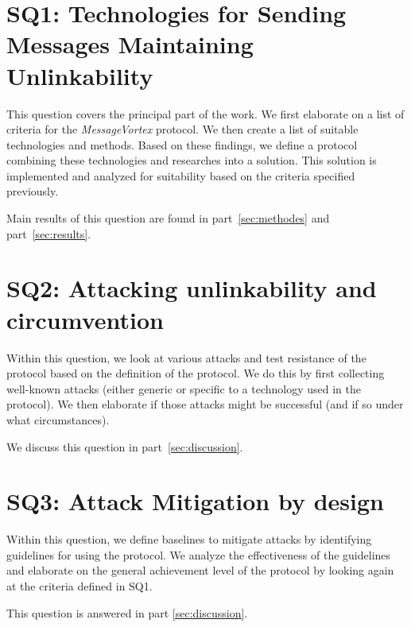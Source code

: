 \section{SQ1: Technologies for Sending Messages Maintaining Unlinkability}
This question covers the principal part of the work. We first elaborate on a list of criteria for the \emph{MessageVortex} protocol. We then create a list of suitable technologies and methods. Based on these findings, we define a protocol combining these technologies and researches into a solution. This solution is implemented and analyzed for suitability based on the criteria specified previously.

Main results of this question are found in part~\ref{sec:methodes} and part~\ref{sec:results}.

\section{SQ2: Attacking unlinkability and circumvention}
Within this question, we look at various attacks and test resistance of the protocol based on the definition of the protocol. We do this by first collecting well-known attacks (either generic or specific to a technology used in the protocol). We then elaborate if those attacks might be successful (and if so under what circumstances).

We discuss this question in part~\ref{sec:discussion}.

\section{SQ3: Attack Mitigation by design}
Within this question, we define baselines to mitigate attacks by identifying guidelines for using the protocol. We analyze the effectiveness of the guidelines and elaborate on the general achievement level of the protocol by looking again at the criteria defined in SQ1. 

This question is answered in part \ref{sec:discussion}.

